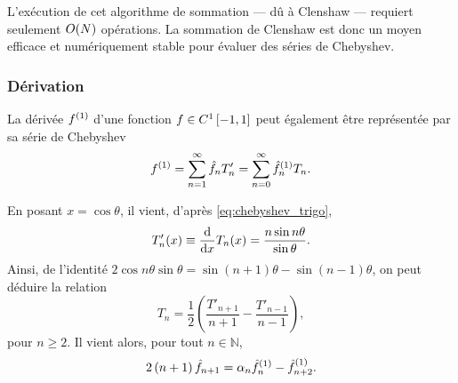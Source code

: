 L'exécution de cet algorithme de sommation --- dû à Clenshaw \cite{clenshaw1955} --- requiert seulement $\bigO{N}$ opérations. %
La sommation de Clenshaw est donc un moyen efficace et numériquement stable pour évaluer des séries de Chebyshev.


\subsubsection{Dérivation}
La dérivée $\deriv{f}{1}$ d'une fonction $f \in C^1\chebinterval$ peut également être représentée par sa série de Chebyshev
\begin{equation}
	\deriv{f}{1} 
	= \sum_{n=1}^{\infty} \hat{f}_n T'_n
	= \sum_{n=0}^{\infty} \deriv{\hat{f}}{1}_n T_n.
	\label{eq:chebyshev_series_derivative}
\end{equation}

En posant $x = \cos\theta$, il vient, d'après \eqref{eq:chebyshev_trigo},
\begin{equation}
	T'_n(x) \equiv \dfdx{T_n(x)}{x} = \frac{n \sin n\theta}{\sin \theta}.
\end{equation}
Ainsi, de l'identité $2 \cos n \theta \sin \theta = \sin(n+1)\theta - \sin(n-1)\theta$, on peut déduire la relation 
\begin{equation}
	T_n = \frac{1}{2} \left( \frac{T'_{n+1}}{n+1} - \frac{T'_{n-1}}{n-1} \right),
\end{equation}
pour $n \geq 2$. Il vient alors, pour tout $n \in \mathbb{N}$,
\begin{equation}
	2 \left( n + 1 \right) \hat{f}_{n+1} = \alpha_n \deriv{\hat{f}}{1}_n - \deriv{\hat{f}}{1}_{n+2}.
\end{equation}

